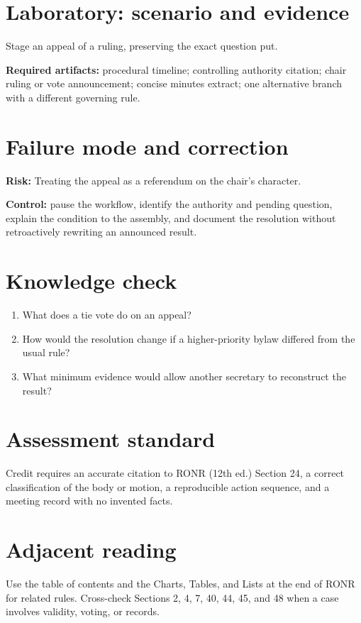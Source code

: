 \documentclass[11pt]{article}
\begin{document}
\section{Laboratory: scenario and evidence}
Stage an appeal of a ruling, preserving the exact question put.

\textbf{Required artifacts:} procedural timeline; controlling authority citation; chair ruling or vote announcement; concise minutes extract; one alternative branch with a different governing rule.

\section{Failure mode and correction}
\textbf{Risk:} Treating the appeal as a referendum on the chair’s character.

\textbf{Control:} pause the workflow, identify the authority and pending question, explain the condition to the assembly, and document the resolution without retroactively rewriting an announced result.

\section{Knowledge check}
\begin{enumerate}[leftmargin=*,itemsep=4pt]
\item What does a tie vote do on an appeal?
\item How would the resolution change if a higher-priority bylaw differed from the usual rule?
\item What minimum evidence would allow another secretary to reconstruct the result?
\end{enumerate}

\section{Assessment standard}
Credit requires an accurate citation to RONR (12th ed.) Section 24, a correct classification of the body or motion, a reproducible action sequence, and a meeting record with no invented facts.

\section{Adjacent reading}
Use the table of contents and the Charts, Tables, and Lists at the end of RONR for related rules. Cross-check Sections 2, 4, 7, 40, 44, 45, and 48 when a case involves validity, voting, or records.
\end{document}
